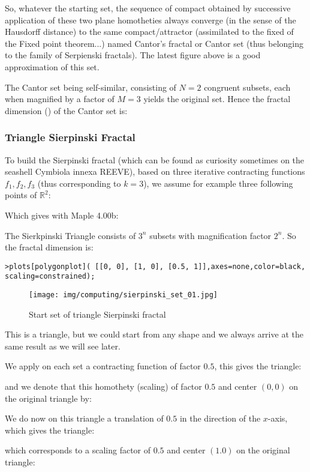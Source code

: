 	So, whatever the starting set, the sequence of compact obtained by successive application of these two plane homotheties always converge (in the sense of the Hausdorff distance) to the same compact/attractor (assimilated to the fixed of the Fixed point theorem...) named Cantor's fractal or Cantor set (thus belonging to the family of Serpienski fractals). The latest figure above is a good approximation of this set.
	
	The Cantor set being self-similar, consisting
of $N=2$ congruent subsets, each when magnified by a factor of $M = 3$ yields the original set. Hence the fractal dimension () of the Cantor set is:
	
	
	\subsubsection{Triangle Sierpinski Fractal}\label{sierpinski fractal}
	To build the Sierpinski fractal (which can be found as curiosity sometimes on the seashell Cymbiola innexa REEVE), based on three iterative contracting functions $f_1,f_2,f_3$ (thus corresponding to $k = 3$), we assume for example three following points of $\mathbb{R}^2$:
	
	Which gives with Maple 4.00b:
	
	The Sierkpinski Triangle consists of $3^n$ subsets with magnification factor $2^n$. So the fractal dimension is:
	
	
	\texttt{>plots[polygonplot]( [[0, 0], [1, 0], [0.5, 1]],axes=none,color=black, scaling=constrained);}
	\begin{figure}[H]
		\centering
		\texttt{[image: img/computing/sierpinski\_set\_01.jpg]}
		\caption[]{Start set of triangle Sierpinski fractal}
	\end{figure}
	This is a triangle, but we could start from any shape and we always arrive at the same result as we will see later.
	
	We apply on each set a contracting function of factor $0.5$, this gives the triangle:
	
	and we denote that this homothety (scaling) of factor $0.5$ and center $(0,0)$ on the original triangle by:
	
	We do now on this triangle a translation of $0.5$ in the direction of the $x$-axis, which gives the triangle:
	
	which corresponds to a scaling factor of $0.5$ and center $(1.0)$ on the original triangle:
	
